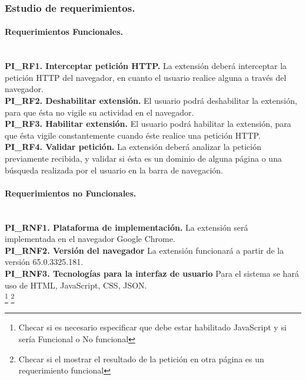 \documentclass[12pt, a4paper, titlepage]{article}
\begin{document}
			\subsubsection{Estudio de requerimientos.}
				
				\paragraph{Requerimientos Funcionales.\\ \\}
				
				{\setlength{\parindent}{12pt}
				\textbf{PI\_RF1. Interceptar petición HTTP.} La extensión deberá interceptar la petición HTTP del navegador, en cuanto el usuario realice alguna a través del navegador.\\

				\textbf{PI\_RF2. Deshabilitar extensión.} El usuario podrá deshabilitar la extensión, para que ésta no vigile su actividad en el navegador.\\
				
				\textbf{PI\_RF3. Habilitar extensión.} El usuario podrá habilitar la extensión, para que ésta vigile constantemente cuando éste realice una petición HTTP.\\
				
				\textbf{PI\_RF4. Validar petición.} La extensión deberá analizar la petición previamente recibida, y validar si ésta es un dominio de alguna página o una búsqueda realizada por el usuario en la barra de navegación.
				}
				
				\paragraph{Requerimientos no Funcionales.\\ \\}
				{\setlength{\parindent}{12pt}
				
				\textbf{PI\_RNF1. Plataforma de implementación.} La extensión será implementada en el navegador Google Chrome.\\
				
				\textbf{PI\_RNF2. Versión del navegador} La extensión funcionará a partir de la versión 65.0.3325.181.\\
				
				\textbf{PI\_RNF3. Tecnologías para la interfaz de usuario} Para el sistema se hará uso de HTML, JavaScript, CSS, JSON.\\
				\footnote{Checar si es necesario especificar que debe estar habilitado JavaScript y si sería Funcional o No funcional}
				\footnote{Checar si el mostrar el resultado de la petición en otra página es un requerimiento funcional}
				}
			
\end{document}
